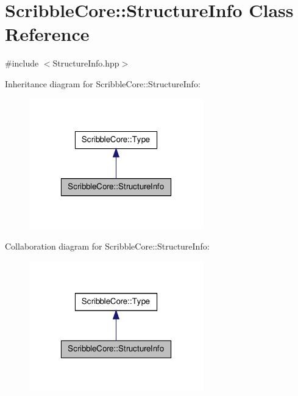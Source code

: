 \hypertarget{class_scribble_core_1_1_structure_info}{\section{Scribble\-Core\-:\-:Structure\-Info Class Reference}
\label{class_scribble_core_1_1_structure_info}
}


{\ttfamily \#include $<$Structure\-Info.\-hpp$>$}



Inheritance diagram for Scribble\-Core\-:\-:Structure\-Info\-:\nopagebreak
\begin{figure}[H]
\begin{center}
\leavevmode
\includegraphics[width=214pt]{class_scribble_core_1_1_structure_info__inherit__graph}
\end{center}
\end{figure}


Collaboration diagram for Scribble\-Core\-:\-:Structure\-Info\-:\nopagebreak
\begin{figure}[H]
\begin{center}
\leavevmode
\includegraphics[width=214pt]{class_scribble_core_1_1_structure_info__coll__graph}
\end{center}
\end{figure}
